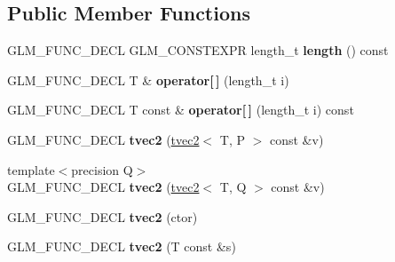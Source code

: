 \subsection*{Public Member Functions}
\begin{DoxyCompactItemize}
\item 
G\+L\+M\+\_\+\+F\+U\+N\+C\+\_\+\+D\+E\+CL G\+L\+M\+\_\+\+C\+O\+N\+S\+T\+E\+X\+PR length\+\_\+t {\bfseries length} () const \hypertarget{structglm_1_1detail_1_1tvec2_aa00a8cbf2d75a3ed2d9f9981ce4d4a93}{}\label{structglm_1_1detail_1_1tvec2_aa00a8cbf2d75a3ed2d9f9981ce4d4a93}

\item 
G\+L\+M\+\_\+\+F\+U\+N\+C\+\_\+\+D\+E\+CL T \& {\bfseries operator\mbox{[}$\,$\mbox{]}} (length\+\_\+t i)\hypertarget{structglm_1_1detail_1_1tvec2_acae6c81d07fce7bf13265a8a1d9fb24c}{}\label{structglm_1_1detail_1_1tvec2_acae6c81d07fce7bf13265a8a1d9fb24c}

\item 
G\+L\+M\+\_\+\+F\+U\+N\+C\+\_\+\+D\+E\+CL T const \& {\bfseries operator\mbox{[}$\,$\mbox{]}} (length\+\_\+t i) const \hypertarget{structglm_1_1detail_1_1tvec2_a837e74429055b5f3bcfc5bf16eab4682}{}\label{structglm_1_1detail_1_1tvec2_a837e74429055b5f3bcfc5bf16eab4682}

\item 
G\+L\+M\+\_\+\+F\+U\+N\+C\+\_\+\+D\+E\+CL {\bfseries tvec2} (\hyperlink{structglm_1_1detail_1_1tvec2}{tvec2}$<$ T, P $>$ const \&v)\hypertarget{structglm_1_1detail_1_1tvec2_a764076eb651c2fd732122e24bb882dbf}{}\label{structglm_1_1detail_1_1tvec2_a764076eb651c2fd732122e24bb882dbf}

\item 
{\footnotesize template$<$precision Q$>$ }\\G\+L\+M\+\_\+\+F\+U\+N\+C\+\_\+\+D\+E\+CL {\bfseries tvec2} (\hyperlink{structglm_1_1detail_1_1tvec2}{tvec2}$<$ T, Q $>$ const \&v)\hypertarget{structglm_1_1detail_1_1tvec2_a6a255de24aea35da27b4f41579b3d56f}{}\label{structglm_1_1detail_1_1tvec2_a6a255de24aea35da27b4f41579b3d56f}

\item 
G\+L\+M\+\_\+\+F\+U\+N\+C\+\_\+\+D\+E\+CL {\bfseries tvec2} (ctor)\hypertarget{structglm_1_1detail_1_1tvec2_af5e5e83f86c18552e4e1045d74f676ad}{}\label{structglm_1_1detail_1_1tvec2_af5e5e83f86c18552e4e1045d74f676ad}

\item 
G\+L\+M\+\_\+\+F\+U\+N\+C\+\_\+\+D\+E\+CL {\bfseries tvec2} (T const \&s)\hypertarget{structglm_1_1detail_1_1tvec2_a85607050278fcecc58b31197bfff1661}{}\label{structglm_1_1detail_1_1tvec2_a85607050278fcecc58b31197bfff1661}


\end{DoxyCompactItemize}
